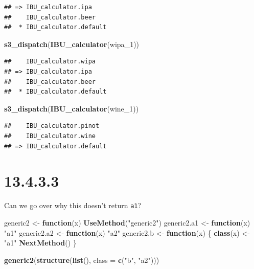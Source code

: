 \documentclass[]{book}
\newenvironment{Shaded}{\begin{snugshade}}{\end{snugshade}}
\newcommand{\ControlFlowTok}[1]{\textcolor[rgb]{0.13,0.29,0.53}{\textbf{#1}}}
\newcommand{\DataTypeTok}[1]{\textcolor[rgb]{0.13,0.29,0.53}{#1}}
\newcommand{\DecValTok}[1]{\textcolor[rgb]{0.00,0.00,0.81}{#1}}
\newcommand{\KeywordTok}[1]{\textcolor[rgb]{0.13,0.29,0.53}{\textbf{#1}}}
\newcommand{\NormalTok}[1]{#1}
\newcommand{\StringTok}[1]{\textcolor[rgb]{0.31,0.60,0.02}{#1}}
\begin{document}
\begin{verbatim}
## => IBU_calculator.ipa
##    IBU_calculator.beer
##  * IBU_calculator.default
\end{verbatim}

\begin{Shaded}
\begin{Highlighting}[]
\KeywordTok{s3_dispatch}\NormalTok{(}\KeywordTok{IBU_calculator}\NormalTok{(wipa_}\DecValTok{1}\NormalTok{))}
\end{Highlighting}
\end{Shaded}

\begin{verbatim}
##    IBU_calculator.wipa
## => IBU_calculator.ipa
##    IBU_calculator.beer
##  * IBU_calculator.default
\end{verbatim}

\begin{Shaded}
\begin{Highlighting}[]
\KeywordTok{s3_dispatch}\NormalTok{(}\KeywordTok{IBU_calculator}\NormalTok{(wine_}\DecValTok{1}\NormalTok{))}
\end{Highlighting}
\end{Shaded}

\begin{verbatim}
##    IBU_calculator.pinot
##    IBU_calculator.wine
## => IBU_calculator.default
\end{verbatim}

\hypertarget{section-1}{%
\section{13.4.3.3}\label{section-1}}

Can we go over why this doesn't return \texttt{a1}?

\begin{Shaded}
\begin{Highlighting}[]
\NormalTok{generic2 <-}\StringTok{ }\ControlFlowTok{function}\NormalTok{(x) }\KeywordTok{UseMethod}\NormalTok{(}\StringTok{"generic2"}\NormalTok{)}
\NormalTok{generic2.a1 <-}\StringTok{ }\ControlFlowTok{function}\NormalTok{(x) }\StringTok{"a1"}
\NormalTok{generic2.a2 <-}\StringTok{ }\ControlFlowTok{function}\NormalTok{(x) }\StringTok{"a2"}
\NormalTok{generic2.b <-}\StringTok{ }\ControlFlowTok{function}\NormalTok{(x) \{}
  \KeywordTok{class}\NormalTok{(x) <-}\StringTok{ "a1"}
  \KeywordTok{NextMethod}\NormalTok{()}
\NormalTok{\}}

\KeywordTok{generic2}\NormalTok{(}\KeywordTok{structure}\NormalTok{(}\KeywordTok{list}\NormalTok{(), }\DataTypeTok{class =} \KeywordTok{c}\NormalTok{(}\StringTok{"b"}\NormalTok{, }\StringTok{"a2"}\NormalTok{)))}
\end{Highlighting}
\end{Shaded}
\end{document}
